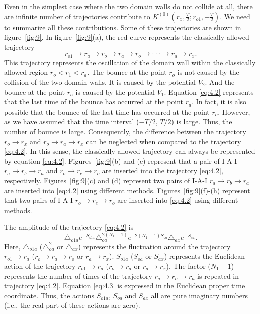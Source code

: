 \documentclass[12pt]{article}
\begin{document}
Even in the simplest case where the two domain walls do not collide at all, there are  infinite number of trajectories contribute to $K^{(0)}(r_{x},\frac{T}{2}; r_{o1}, -\frac{T}{2})$. We need to summarize all these contributions. Some of these trajectories are shown in figure~\ref{fig:9}. In figure~\ref{fig:9}(a), the red curve represents the classically allowed trajectory
\begin{equation}
\label{eq:4.2}%
r_{o1}\rightarrow r_{a}\rightarrow r_{o} \rightarrow r_{a}\rightarrow r_{o}\rightarrow\cdot\cdot\cdot\rightarrow r_{a}\rightarrow r_{x}.
\end{equation}
This trajectory represents the oscillation of the domain wall \uppercase\expandafter{} within the classically allowed region $r_{o}<r_{1}<r_{a}$.
The bounce at the point $r_{o}$ is not caused by the collision of the two domain walls. It is caused by the potential $V_{2}$. And the bounce at the point $r_{a}$ is caused by the potential $V_{1}$. Equation \eqref{eq:4.2} represents that the last time of the bounce has occurred at the point $r_{a}$. In fact, it is also possible that the bounce of the last time has occurred at the point $r_{o}$. However,  as we have assumed that the time interval ($-T/2$, $T/2$) is large. Thus, the number of bounce is large. Consequently, the difference between the trajectory $r_{o}\rightarrow r_{x}$ and $r_{o}\rightarrow r_{a}\rightarrow r_{x}$ can be neglected when compared to the trajectory \eqref{eq:4.2}. In this sense, the classically allowed trajectory can always be represented by equation \eqref{eq:4.2}. Figures~\ref{fig:9}(b) and (e) represent that a pair of I-A-I $r_{a}\rightarrow r_{b}\rightarrow r_{a}$ and $r_{o}\rightarrow r_{e}\rightarrow r_{o}$ are inserted into the trajectory \eqref{eq:4.2}, respectively. Figures~\ref{fig:9}(c) and (d) represent two pairs of  I-A-I $r_{a}\rightarrow r_{b}\rightarrow r_{a}$ are inserted into \eqref{eq:4.2} using different methods.  Figures~\ref{fig:9}(f)-(h) represent that two pairs of I-A-I $r_{o}\rightarrow r_{e}\rightarrow r_{o}$ are inserted into \eqref{eq:4.2} using different methods.

The amplitude of the trajectory \eqref{eq:4.2} is
\begin{equation}
\label{eq:4.3}%
\triangle_{o1a}e^{-S_{o1a}}\triangle_{oa}^{2(N_{1}-1)}e^{-2(N_{1}-1)S_{oa}}\triangle_{ax}e^{-S_{ax}}.
\end{equation}
Here, $\triangle_{o1a}$ ($\triangle_{oa}^{2}$ or $\triangle_{ax}$) represents the fluctuation around the trajectory $r_{o1}\rightarrow r_{a}$ ($r_{o}\rightarrow r_{a}\rightarrow r_{o}$ or $r_{a}\rightarrow r_{x}$). $S_{o1a}$ ($S_{oa}$ or $S_{ax}$) represents the Euclidean action of the trajectory $r_{o1}\rightarrow r_{a}$ ($r_{o}\rightarrow r_{a}$ or $r_{a}\rightarrow r_{x}$). The factor ($N_{1}-1$) represents the number of times of the trajectory $r_{a}\rightarrow r_{o}\rightarrow r_{a}$ is repeated in trajectory \eqref{eq:4.2}. Equation \eqref{eq:4.3} is expressed in the Euclidean proper time coordinate. Thus, the actions $S_{o1a}$, $S_{oa}$  and $S_{ax}$ all are pure imaginary numbers (i.e., the real part of these actions are zero).
\end{document}
